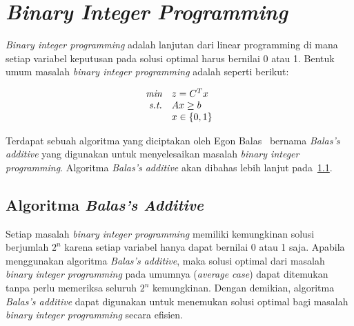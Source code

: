 %		
%		

\section{\textit{Binary Integer Programming}}
\label{sec:bip}
\textit{Binary integer programming} adalah lanjutan dari linear programming di mana setiap variabel keputusan pada solusi optimal harus bernilai 0 atau 1. Bentuk umum masalah \textit{binary integer programming} adalah seperti berikut:

\begin{equation}
\begin{array}{r l}
\textit{min}   & z=C^Tx \\
\textit{s.t.} & Ax\geq b \\
& x \in \{0,1\}
\end{array}    
\end{equation}

Terdapat sebuah algoritma yang diciptakan oleh Egon Balas~\cite{balas1965additive} bernama \textit{Balas's additive} yang digunakan untuk menyelesaikan masalah \textit{binary integer programming}. Algoritma \textit{Balas's additive} akan dibahas lebih lanjut pada~\ref{balas_additive}.

\subsection{Algoritma \textit{Balas's Additive}}
\label{balas_additive}
Setiap masalah \textit{binary integer programming} memiliki kemungkinan solusi berjumlah \(2^n\) karena setiap variabel hanya dapat bernilai 0 atau 1 saja. Apabila menggunakan algoritma \textit{Balas's additive}, maka solusi optimal dari masalah \textit{binary integer programming} pada umumnya (\textit{average case}) dapat ditemukan tanpa perlu memeriksa seluruh \(2^n\) kemungkinan. Dengan demikian, algoritma \textit{Balas's additive} dapat digunakan untuk menemukan solusi optimal bagi masalah \textit{binary integer programming} secara efisien.

